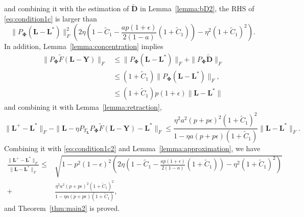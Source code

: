 \documentclass[12pt]{article}
\newcommand{\bL}{\boldsymbol{L}}
\newcommand{\bD}{\boldsymbol{D}}
\def\bY{\boldsymbol{Y}}
\theoremstyle{plain}
\theoremstyle{definition}
\theoremstyle{plain}
\theoremstyle{plain}
\theoremstyle{remark}
\begin{document}
and combining it with the estimation of $\tilde{\bD}$ in Lemma~\ref{lemma:bD2}, the RHS of \eqref{eq:condition1c} is larger than
\begin{equation}
\|P_{\mathbf{\Phi}}(\bL-\bL^*)\|_F^2\left(2\eta\left(1-\tilde{C}_1-\frac{ap(1+\epsilon)}{2(1-a)}(1+\tilde{C}_1)\right)-\eta^2(1+\tilde{C}_1)^2\right).\label{eq:condition1c2}
\end{equation}
In addition,  Lemma~\ref{lemma:concentration} implies
\begin{align*}
\|P_{\mathbf{\Phi}}\tilde{F}(\bL-\bY)\|_{F} & \leq\|P_{\mathbf{\Phi}}(\bL-\bL^{*})\|_{F}+\|P_{\mathbf{\Phi}}\tilde{\bD}\|_{F}\\
 & \leq(1+\tilde{C}_{1})\|P_{\mathbf{\Phi}}(\bL-\bL^{*})\|_{F},\\
 & \leq(1+\tilde{C}_{1})p(1+\epsilon)\|\bL-\bL^{*}\|
\end{align*}
and combining it with Lemma~\ref{lemma:retraction},
\[
\|\bL^+-\bL^*\|_F-\|\bL-\eta P_{T_{\bL}} P_{\mathbf{\Phi}}\tilde{F}(\bL-\bY)-\bL^*\|_F\leq 
\frac{\eta^2a^2(p+p\epsilon)^2(1+\tilde{C}_1)^2}{1-\eta a(p+p\epsilon)(1+\tilde{C}_1)}\|\bL-\bL^*\|_F.
\]
Combining it with \eqref{eq:condition1c2} and Lemma~\ref{lemma:approximation}, we have
\begin{align*}
\frac{\|\bL^+-\bL^*\|_F}{\|\bL-\bL^*\|_F}\leq&\sqrt{1-p^2(1-\epsilon)^2\left(2\eta\left(1-\tilde{C}_1-\frac{ap(1+\epsilon)}{2(1-a)}(1+\tilde{C}_1)\right)-\eta^2(1+\tilde{C}_1)^2\right)}\\+&\frac{\eta^2a^2(p+p\epsilon)^2(1+\tilde{C}_1)^2}{1-\eta a(p+p\epsilon)(1+\tilde{C}_1)},
\end{align*}
and Theorem~\ref{thm:main2} is proved.
\end{document}
